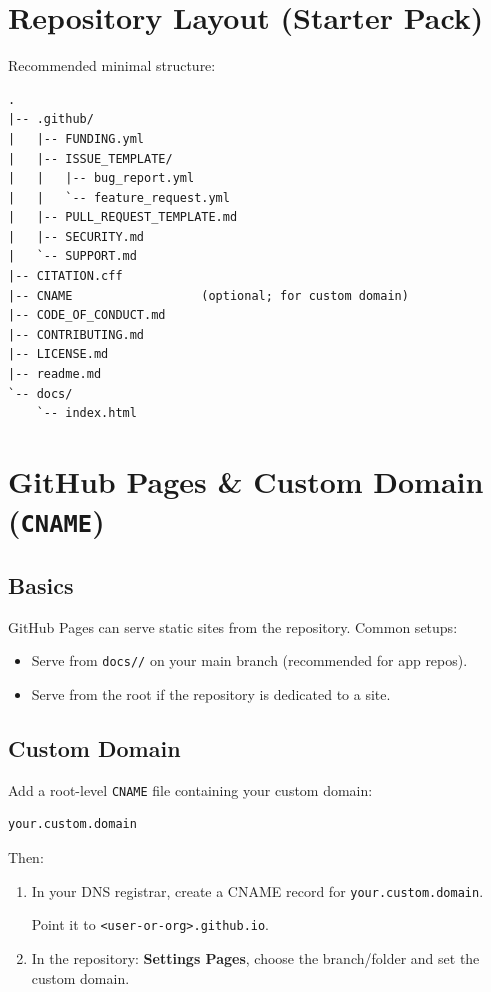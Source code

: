 \documentclass[11pt]{article}
\newcommand{\file}[1]{\texttt{#1}}
\newcommand{\dir}[1]{\texttt{#1/}}
\begin{document}
\section{Repository Layout (Starter Pack)}
Recommended minimal structure:
\begin{verbatim}
.
|-- .github/
|   |-- FUNDING.yml
|   |-- ISSUE_TEMPLATE/
|   |   |-- bug_report.yml
|   |   `-- feature_request.yml
|   |-- PULL_REQUEST_TEMPLATE.md
|   |-- SECURITY.md
|   `-- SUPPORT.md
|-- CITATION.cff
|-- CNAME                  (optional; for custom domain)
|-- CODE_OF_CONDUCT.md
|-- CONTRIBUTING.md
|-- LICENSE.md
|-- readme.md
`-- docs/
    `-- index.html
\end{verbatim}
\clearpage

\section{GitHub Pages \& Custom Domain (\file{CNAME})}
\subsection{Basics}
GitHub Pages can serve static sites from the repository. Common setups:
\begin{itemize}
  \item Serve from \dir{docs/} on your main branch (recommended for app repos).
  \item Serve from the root if the repository is dedicated to a site.
\end{itemize}

\subsection{Custom Domain}
Add a root-level \file{CNAME} file containing your custom domain:
\begin{verbatim}
your.custom.domain
\end{verbatim}

Then:
\begin{enumerate}
  \item In your DNS registrar, create a CNAME record for \texttt{your.custom.domain}.\par Point it to \texttt{<user-or-org>.github.io}.
  \item In the repository: \textbf{Settings \textrightarrow{} Pages}, choose the branch/folder and set the custom domain.
\end{enumerate}
\end{document}
